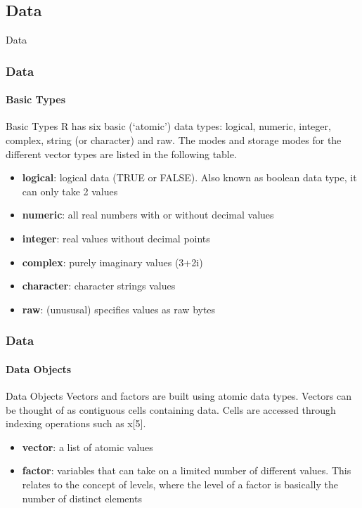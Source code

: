 \documentclass[
	11pt, %
]{beamer}
\begin{document}
\subsection{Data}
\begin{frame}[fragile]{Data}
	\frametitle{Data}
	\framesubtitle{Basic Types} %
 \begin{block}{Basic Types}
	 R has six basic (‘atomic’) data types: logical, numeric, integer, complex, string (or character) and raw. The modes and storage modes for the different vector types are listed in the following table.
			\begin{itemize}
			\small
        \item \textbf{logical}: logical data (TRUE or FALSE). Also known as boolean data type, it can only take 2 values
        \item \textbf{numeric}: all real numbers with or without decimal values
        \item \textbf{integer}: real values without decimal points
        \item \textbf{complex}: purely imaginary values (3+2i)
        \item \textbf{character}: character strings values
        \item \textbf{raw}: (unususal) specifies values as raw bytes
			\end{itemize}
	\end{block}
			\end{frame}



 \begin{frame}
	\frametitle{Data}
	\framesubtitle{Data Objects} %
 \begin{block}{Data Objects}
		Vectors and factors are built using atomic data types.	Vectors can be thought of as contiguous cells containing data. Cells are accessed through indexing operations such as x[5].
			\begin{itemize}
			\small
        \item \textbf{vector}: a list of atomic values
        \item \textbf{factor}: variables that can take on a limited number of different values. This relates to the concept of levels, where the level of a factor is basically the number of distinct elements
			\end{itemize}
	\end{block}
			\end{frame}
\end{document}
